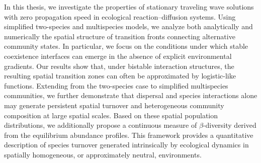 \newpage

In this thesis, we investigate the properties of stationary traveling wave solutions with zero propagation speed in ecological reaction--diffusion systems. Using simplified two-species and multispecies models, we analyze both analytically and numerically the spatial structure of transition fronts connecting alternative community states. In particular, we focus on the conditions under which stable coexistence interfaces can emerge in the absence of explicit environmental gradients. Our results show that, under bistable interaction structures, the resulting spatial transition zones can often be approximated by logistic-like functions. Extending from the two-species case to simplified multispecies communities, we further demonstrate that dispersal and species interactions alone may generate persistent spatial turnover and heterogeneous community composition at large spatial scales. Based on these spatial population distributions, we additionally propose a continuous measure of $\beta$-diversity derived from the equilibrium abundance profiles. This framework provides a quantitative description of species turnover generated intrinsically by ecological dynamics in spatially homogeneous, or approximately neutral, environments.